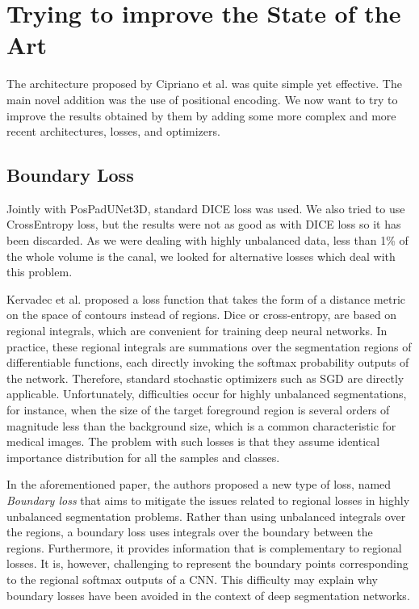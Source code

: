 
\chapter{Trying to improve the State of the Art}

\label{chp:refwork}

\def\:{\hskip0pt} %
The architecture proposed by Cipriano et al. was quite simple yet effective. The
main novel addition was the use of positional encoding. We now want to try to
improve the results obtained by them by adding some more complex
and more recent architectures, losses, and optimizers.

\section{Boundary Loss}
Jointly with PosPadUNet3D, standard DICE loss was used. We also tried to use
CrossEntropy loss, but the results were not as good as with DICE loss so it has
been discarded. As we were dealing with highly unbalanced data, less than 1\% of
the whole volume is the canal, we looked for alternative losses which deal with
this problem.

Kervadec et al. \cite{kervadec2019boundary} proposed a loss function that takes
the form of a distance metric on the space of contours instead of regions. Dice
or cross-entropy, are based on regional integrals, which are convenient for
training deep neural networks. In practice, these regional integrals are
summations over the segmentation regions of differentiable functions, each
directly invoking the softmax probability outputs of the network. Therefore,
standard stochastic optimizers such as SGD are directly applicable.
Unfortunately, difficulties occur for highly unbalanced segmentations, for
instance, when the size of the target foreground region is several orders of
magnitude less than the background size, which is a common characteristic for
medical images. The problem with such losses is that they assume identical
importance distribution for all the samples and classes.

In the aforementioned paper, the authors proposed a new type of loss, named
\emph{Boundary loss} that aims to mitigate the issues related to regional losses
in highly unbalanced segmentation problems. Rather than using unbalanced
integrals over the regions, a boundary loss uses integrals over the boundary
between the regions. Furthermore, it provides information that is complementary
to regional losses. It is, however, challenging to represent the boundary points
corresponding to the regional softmax outputs of a CNN. This difficulty may
explain why boundary losses have been avoided in the context of deep
segmentation networks.

